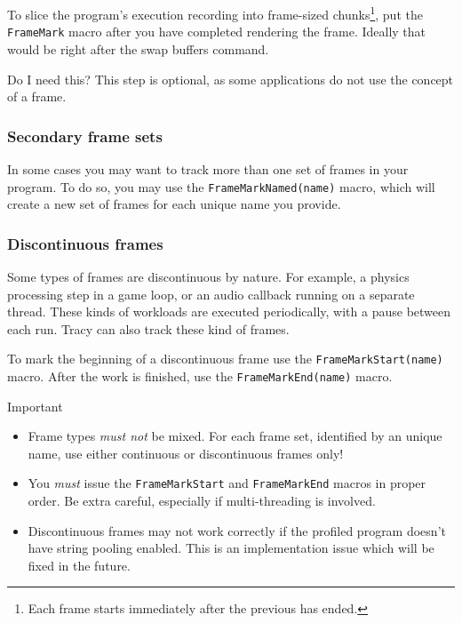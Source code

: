 \documentclass[hidelinks,titlepage,a4paper]{article}
\begin{document}
To slice the program's execution recording into frame-sized chunks\footnote{Each frame starts immediately after the previous has ended.}, put the \texttt{FrameMark} macro after you have completed rendering the frame. Ideally that would be right after the swap buffers command.

\begin{bclogo}[
noborder=true,
couleur=black!5,
logo=\bclampe
]{Do I need this?}
This step is optional, as some applications do not use the concept of a frame.
\end{bclogo}

\subsubsection{Secondary frame sets}
\label{secondaryframeset}

In some cases you may want to track more than one set of frames in your program. To do so, you may use the \texttt{FrameMarkNamed(name)} macro, which will create a new set of frames for each unique name you provide.

\subsubsection{Discontinuous frames}

Some types of frames are discontinuous by nature. For example, a physics processing step in a game loop, or an audio callback running on a separate thread. These kinds of workloads are executed periodically, with a pause between each run. Tracy can also track these kind of frames.

To mark the beginning of a discontinuous frame use the \texttt{FrameMarkStart(name)} macro. After the work is finished, use the \texttt{FrameMarkEnd(name)} macro.

\begin{bclogo}[
noborder=true,
couleur=black!5,
logo=\bcbombe
]{Important}
\begin{itemize}
\item Frame types \emph{must not} be mixed. For each frame set, identified by an unique name, use either continuous or discontinuous frames only!
\item You \emph{must} issue the \texttt{FrameMarkStart} and \texttt{FrameMarkEnd} macros in proper order. Be extra careful, especially if multi-threading is involved.
\item Discontinuous frames may not work correctly if the profiled program doesn't have string pooling enabled. This is an implementation issue which will be fixed in the future.
\end{itemize}
\end{bclogo}
\end{document}
